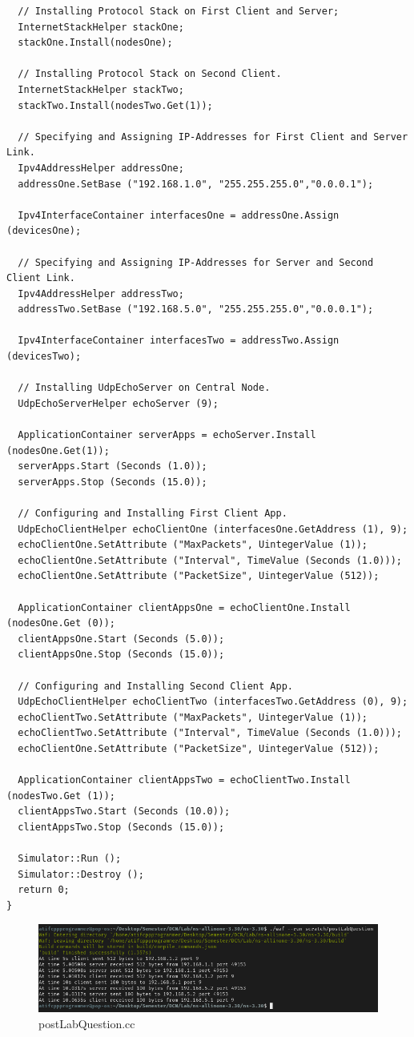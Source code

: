 \documentclass[fullpage]{article}
\begin{document}
\begin{verbatim}
  // Installing Protocol Stack on First Client and Server;
  InternetStackHelper stackOne;
  stackOne.Install(nodesOne);

  // Installing Protocol Stack on Second Client.
  InternetStackHelper stackTwo;
  stackTwo.Install(nodesTwo.Get(1));

  // Specifying and Assigning IP-Addresses for First Client and Server Link.
  Ipv4AddressHelper addressOne;
  addressOne.SetBase ("192.168.1.0", "255.255.255.0","0.0.0.1");

  Ipv4InterfaceContainer interfacesOne = addressOne.Assign (devicesOne);

  // Specifying and Assigning IP-Addresses for Server and Second Client Link.
  Ipv4AddressHelper addressTwo;
  addressTwo.SetBase ("192.168.5.0", "255.255.255.0","0.0.0.1");

  Ipv4InterfaceContainer interfacesTwo = addressTwo.Assign (devicesTwo);

  // Installing UdpEchoServer on Central Node.
  UdpEchoServerHelper echoServer (9);

  ApplicationContainer serverApps = echoServer.Install (nodesOne.Get(1));
  serverApps.Start (Seconds (1.0));
  serverApps.Stop (Seconds (15.0));

  // Configuring and Installing First Client App.
  UdpEchoClientHelper echoClientOne (interfacesOne.GetAddress (1), 9);
  echoClientOne.SetAttribute ("MaxPackets", UintegerValue (1));
  echoClientOne.SetAttribute ("Interval", TimeValue (Seconds (1.0)));
  echoClientOne.SetAttribute ("PacketSize", UintegerValue (512));

  ApplicationContainer clientAppsOne = echoClientOne.Install (nodesOne.Get (0));
  clientAppsOne.Start (Seconds (5.0));
  clientAppsOne.Stop (Seconds (15.0));

  // Configuring and Installing Second Client App.
  UdpEchoClientHelper echoClientTwo (interfacesTwo.GetAddress (0), 9);
  echoClientTwo.SetAttribute ("MaxPackets", UintegerValue (1));
  echoClientTwo.SetAttribute ("Interval", TimeValue (Seconds (1.0)));
  echoClientOne.SetAttribute ("PacketSize", UintegerValue (512));

  ApplicationContainer clientAppsTwo = echoClientTwo.Install (nodesTwo.Get (1));
  clientAppsTwo.Start (Seconds (10.0));
  clientAppsTwo.Stop (Seconds (15.0));

  Simulator::Run ();
  Simulator::Destroy ();
  return 0;
}
\end{verbatim}

\begin{figure}[h!]
  \includegraphics[width=\linewidth]{postLabQuestion.png}
  \caption{postLabQuestion.cc}
  \label{fig:output2}
\end{figure}
\end{document}
